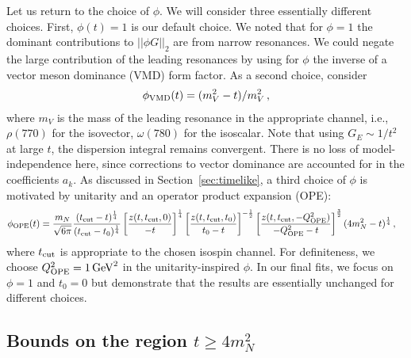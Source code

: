 \documentclass[12pt]{article}
\begin{document}
Let us return to the choice of $\phi$.   
We will consider three essentially different choices.  First, $\phi(t)=1$ is our default choice. 
We noted that for $\phi=1$ the dominant contributions to $||\phi G||_2$ are from narrow resonances.
We could negate the large contribution of the 
leading resonances by using for $\phi$ the inverse of a vector meson dominance (VMD) form factor.   
As a second choice, consider 
\begin{align}\label{eq:phivmd}
\phi_{\rm VMD}(t) = (m_V^2-t)/m_V^2 \,, 
\end{align}
where $m_V$ is the mass of the leading resonance in the appropriate channel, i.e., 
$\rho(770)$ for the isovector, $\omega(780)$ for the  isoscalar.  
Note that using $G_{E} \sim 1/t^2$ at large $t$, the dispersion integral remains convergent. 
There is no loss of model-independence here, since corrections to vector dominance are accounted for 
in the coefficients $a_k$.   
As discussed in Section~\ref{sec:timelike}, a third choice of $\phi$ is motivated by unitarity and an operator 
product expansion (OPE): 
\begin{align}\label{eq:phiunitary}
\phi_{\rm OPE}(t) &= {m_N \over \sqrt{6\pi}} { (t_{\rm cut} - t)^\frac14 \over (t_{\rm cut} - t_0)^\frac14 } \left[ z(t,t_{\rm cut},0)\over -t \right]^\frac14 
\left[ z(t,t_{\rm cut},t_0)\over t_0-t\right]^{-\frac12} \left[ z(t,t_{\rm cut},-Q_{\rm OPE}^2)\over -Q_{\rm OPE}^2-t \right]^\frac32 (4m_N^2 - t)^\frac14 \,,
\end{align}
where $t_{\rm cut}$ is appropriate to the chosen isospin channel.  
For definiteness, we choose $Q_{\rm OPE}^2=1\,{\rm GeV}^2$ in the unitarity-inspired $\phi$.    
In our final fits, we focus on $\phi=1$ and $t_0=0$ but demonstrate that the results 
are essentially unchanged for different choices. 

\subsection{Bounds on the region $t\ge 4m_N^2$ \label{sec:timelike}}
\end{document}
